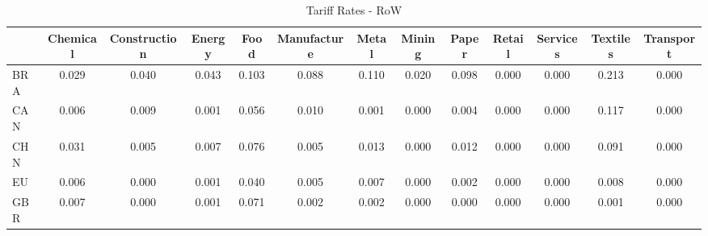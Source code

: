 \begin{table}[htbp]
\centering
\caption{Tariff Rates - RoW} 
\label{tab:tariff_RoW}
\begin{tabular}{lcccccccccccc}
  \hline
 & Chemical & Construction & Energy & Food & Manufacture & Metal & Mining & Paper & Retail & Services & Textiles & Transport \\ 
  \hline
BRA & \textcolor[RGB]{72,47,183}{0.029} & \textcolor[RGB]{59,38,196}{0.040} & \textcolor[RGB]{57,37,198}{0.043} & \textcolor[RGB]{19,12,236}{0.103} & \textcolor[RGB]{28,18,227}{0.088} & \textcolor[RGB]{17,11,238}{0.110} & \textcolor[RGB]{81,52,174}{0.020} & \textcolor[RGB]{21,14,234}{0.098} & \textcolor[RGB]{255,165,0}{0.000} & \textcolor[RGB]{255,165,0}{0.000} & \textcolor[RGB]{2,1,253}{0.213} & \textcolor[RGB]{255,165,0}{0.000} \\ 
  CAN & \textcolor[RGB]{117,76,138}{0.006} & \textcolor[RGB]{104,67,151}{0.009} & \textcolor[RGB]{147,95,108}{0.001} & \textcolor[RGB]{51,33,204}{0.056} & \textcolor[RGB]{102,66,153}{0.010} & \textcolor[RGB]{142,92,113}{0.001} & \textcolor[RGB]{255,165,0}{0.000} & \textcolor[RGB]{128,82,128}{0.004} & \textcolor[RGB]{255,165,0}{0.000} & \textcolor[RGB]{255,165,0}{0.000} & \textcolor[RGB]{15,10,240}{0.117} & \textcolor[RGB]{255,165,0}{0.000} \\ 
  CHN & \textcolor[RGB]{70,45,185}{0.031} & \textcolor[RGB]{123,80,132}{0.005} & \textcolor[RGB]{113,73,142}{0.007} & \textcolor[RGB]{34,22,221}{0.076} & \textcolor[RGB]{119,77,136}{0.005} & \textcolor[RGB]{89,58,166}{0.013} & \textcolor[RGB]{255,165,0}{0.000} & \textcolor[RGB]{96,62,159}{0.012} & \textcolor[RGB]{255,165,0}{0.000} & \textcolor[RGB]{255,165,0}{0.000} & \textcolor[RGB]{25,16,230}{0.091} & \textcolor[RGB]{255,165,0}{0.000} \\ 
  EU & \textcolor[RGB]{115,74,140}{0.006} & \textcolor[RGB]{151,98,104}{0.000} & \textcolor[RGB]{142,92,113}{0.001} & \textcolor[RGB]{64,41,191}{0.040} & \textcolor[RGB]{119,77,136}{0.005} & \textcolor[RGB]{110,72,144}{0.007} & \textcolor[RGB]{255,165,0}{0.000} & \textcolor[RGB]{134,87,121}{0.002} & \textcolor[RGB]{255,165,0}{0.000} & \textcolor[RGB]{255,165,0}{0.000} & \textcolor[RGB]{106,69,149}{0.008} & \textcolor[RGB]{255,165,0}{0.000} \\ 
  GBR & \textcolor[RGB]{108,70,147}{0.007} & \textcolor[RGB]{255,165,0}{0.000} & \textcolor[RGB]{149,96,106}{0.001} & \textcolor[RGB]{40,26,215}{0.071} & \textcolor[RGB]{136,88,119}{0.002} & \textcolor[RGB]{138,89,117}{0.002} & \textcolor[RGB]{255,165,0}{0.000} & \textcolor[RGB]{255,165,0}{0.000} & \textcolor[RGB]{255,165,0}{0.000} & \textcolor[RGB]{255,165,0}{0.000} & \textcolor[RGB]{140,91,115}{0.001} & \textcolor[RGB]{255,165,0}{0.000} \\ 

\end{tabular}
\end{table}
